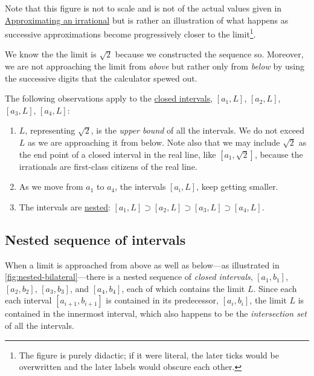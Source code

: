 \documentclass[
  a4paper,
]{article}
\begin{document}
Note that this figure is not to scale and is not of the actual values
given in \hyperref[approximating-an-irrational]{Approximating an
irrational} but is rather an illustration of what happens as successive
approximations become progressively closer to the limit\footnote{The
  figure is purely didactic; if it were literal, the later ticks would
  be overwritten and the later labels would obscure each other.}.

We know the the limit is \(\sqrt{2}\) because we constructed the
sequence so. Moreover, we are not approaching the limit from
\emph{above} but rather only from \emph{below} by using the successive
digits that the calculator spewed out.

The following observations apply to the
\href{https://mathworld.wolfram.com/ClosedInterval.html}{closed
intervals}, \([a_1, L]\), \([a_2, L]\), \([a_3, L]\), \([a_4, L]\):

\begin{enumerate}
\def\labelenumi{\alph{enumi}.}
\item
  \(L\), representing \(\sqrt{2}\), is the \emph{upper bound} of all the
  intervals. We do not exceed \(L\) as we are approaching it from below.
  Note also that we may include \(\sqrt{2}\) as the end point of a
  closed interval in the real line, like \([a_1, \sqrt{2}]\), because
  the irrationals are first-class citizens of the real line.
\item
  As we move from \(a_1\) to \(a_4\), the intervals \([a_i, L]\), keep
  getting smaller.
\item
  The intervals are
  \href{https://en.wikipedia.org/wiki/Nested_intervals}{nested}:
  \([a_1, L] \supset [a_2, L] \supset [a_3, L] \supset [a_4, L]\).
\end{enumerate}

\subsection{Nested sequence of
intervals}\label{nested-sequence-of-intervals}

When a limit is approached from above as well as below---as illustrated
in \cref{fig:nested-bilateral}---there is a nested sequence of
\emph{closed intervals}, \([a_1, b_1]\), \([a_2, b_2]\), \([a_3, b_3]\),
and \([a_4, b_4]\), each of which contains the limit \(L\). Since each
each interval \([a_{i+1}, b_{i+1}]\) is contained in its predecessor,
\([a_{i}, b_{i}]\), the limit \(L\) is contained in the innermost
interval, which also happens to be the \emph{intersection set} of all
the intervals.
\end{document}
